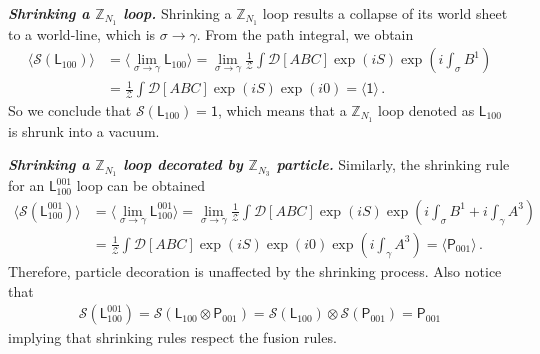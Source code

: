 \documentclass[11pt,nofootinbib,preprint]{revtex4-1}
\begin{document}
\textbf{\textit{Shrinking a $\mathbb{Z}_{N_1}$ loop.}}
Shrinking a $\mathbb{Z}_{N_1}$ loop results a collapse of  its world sheet to a world-line, which is $\sigma\rightarrow \gamma$. From the path integral, we obtain
\begin{align}
	\langle \mathcal{S} \left( \mathsf{L}_{100} \right) \rangle &=\langle \underset{\sigma \rightarrow \gamma}{\lim}\mathsf{L}_{100} \rangle =\underset{\sigma \rightarrow \gamma}{\lim}\frac{1}{\mathcal{Z}}\int{\mathcal{D} \left[ ABC \right] \exp \left( iS \right) \exp \left( i\int_{\sigma}{B^1} \right)}\nonumber
	\\
	&=\frac{1}{\mathcal{Z}}\int{\mathcal{D} \left[ ABC \right] \exp \left( iS \right) \exp \left( i0 \right)}=\langle \mathsf{1} \rangle\,. 
\end{align}
So we conclude that
 $	\mathcal{S} \left( \mathsf{L}_{100} \right)=\mathsf{1}
$, which means that a $\mathbb{Z}_{N_1}$ loop denoted as $\mathsf{L}_{100}$ is shrunk into a vacuum.




\textbf{\textit{Shrinking a $\mathbb{Z}_{N_1}$ loop decorated by $\mathbb{Z}_{N_3}$ particle.}}
Similarly, the shrinking rule for an $\mathsf{L}_{100}^{001}$ loop can be obtained
\begin{align}
	\langle \mathcal{S} \left( \mathsf{L}_{100}^{001} \right) \rangle &=\langle \underset{\sigma \rightarrow \gamma}{\lim}\mathsf{L}_{100}^{001} \rangle =\underset{\sigma \rightarrow \gamma}{\lim}\frac{1}{\mathcal{Z}}\int{\mathcal{D} \left[ ABC\right] \exp \left( iS \right) \exp \left( i\int_{\sigma}{B^1}+i\int_{\gamma}{A^3} \right)}\nonumber
	\\
	&=\frac{1}{\mathcal{Z}}\int{\mathcal{D} \left[ ABC \right] \exp \left( iS \right) \exp \left( i0 \right) \exp \left( i\int_{\gamma}{A^3} \right)}=\langle \mathsf{P}_{001} \rangle \,.
\end{align}
Therefore, particle decoration is unaffected by the shrinking process. Also notice that 
\begin{align}
	\mathcal{S} \left( \mathsf{L}_{100}^{001} \right)=\mathcal{S} \left( \mathsf{L}_{100}\otimes \mathsf{P}_{001} \right)=\mathcal{S} \left( \mathsf{L}_{100} \right)\otimes\mathcal{S} \left( \mathsf{P}_{001} \right)=\mathsf{P}_{001}
\end{align}
implying that shrinking rules respect the fusion rules.
\end{document}
